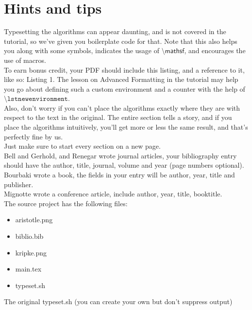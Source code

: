\documentclass[a4paper,12pt]{article}
\numberwithin{definition}{section}
\numberwithin{mytheorem}{subsection}
\begin{document}
\section{Hints and tips}
Typesetting the algorithms can appear daunting, and is not covered in the tutorial, so we’ve given
you boilerplate code for that. Note that this also helps you along with some symbols, indicates
the usage of $\textsf{\textbackslash mathsf}$, and encourages the use of macros.\\
To earn bonus credit, your PDF should include this listing, and a reference to it, like so: Listing
1. The lesson on Advanced Formatting in the tutorial may help you go about defining such a
custom environment and a counter with the help of $\texttt{\textbackslash lstnewenvironment}$.\\
Also, don’t worry if you can’t place the algorithms exactly where they are with respect to the text
in the original. The entire section tells a story, and if you place the algorithms intuitively, you’ll
get more or less the same result, and that’s perfectly fine by us.\\
Just make sure to start every section on a new page.\\
Bell and Gerhold, and Renegar wrote journal articles, your bibliography entry should have the
author, title, journal, volume and year (page numbers optional).\\
Bourbaki wrote a book, the fields in your entry will be author, year, title and publisher.\\
Mignotte wrote a conference article, include author, year, title, booktitle.\\
The source project has the following files:\\
\begin{itemize}
    \item aristotle.png
    \item biblio.bib
    \item kripke.png
    \item main.tex
    \item typeset.sh
\end{itemize}

The original typeset.sh (you can create your own but don’t suppress output)
\clearpage






\pagebreak





\pagebreak


\newpage
\end{document}
